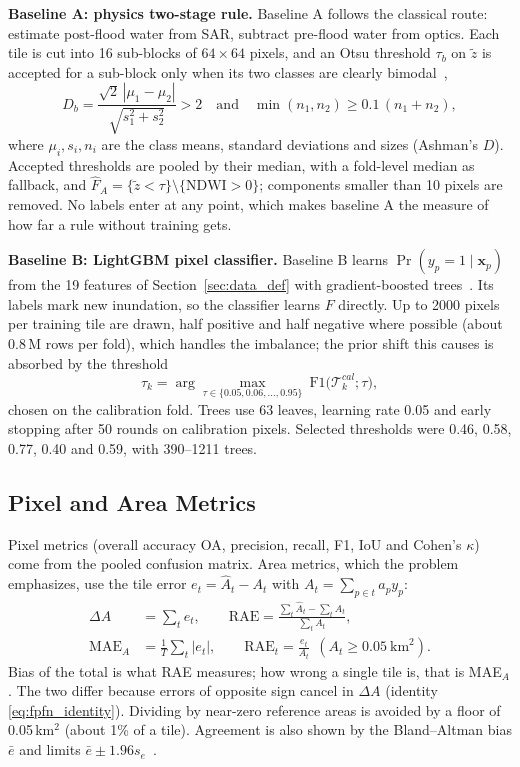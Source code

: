 \textbf{Baseline A: physics two-stage rule.} Baseline A follows the classical route: estimate post-flood water from SAR, subtract pre-flood water from optics. Each tile is cut into 16 sub-blocks of $64\times64$ pixels, and an Otsu threshold $\tau_b$ on $\tilde z$ is accepted for a sub-block only when its two classes are clearly bimodal~\cite{martinis2009splitbased},
\begin{equation}
D_b=\frac{\sqrt2\,|\mu_1-\mu_2|}{\sqrt{s_1^2+s_2^2}}>2\quad\text{and}\quad \min(n_1,n_2)\ge0.1\,(n_1+n_2),
\label{eq:ashman}
\end{equation}
where $\mu_i,s_i,n_i$ are the class means, standard deviations and sizes (Ashman's $D$). Accepted thresholds are pooled by their median, with a fold-level median as fallback, and $\hat F_A=\{\tilde z<\tau\}\setminus\{\mathrm{NDWI}>0\}$; components smaller than 10 pixels are removed. No labels enter at any point, which makes baseline A the measure of how far a rule without training gets.

\textbf{Baseline B: LightGBM pixel classifier.} Baseline B learns $\Pr(y_p=1\mid\boldsymbol x_p)$ from the 19 features of Section~\ref{sec:data_def} with gradient-boosted trees~\cite{lightgbm2020package}. Its labels mark new inundation, so the classifier learns $F$ directly. Up to 2000 pixels per training tile are drawn, half positive and half negative where possible (about 0.8\,M rows per fold), which handles the imbalance; the prior shift this causes is absorbed by the threshold
\begin{equation}
\tau_k=\arg\max_{\tau\in\{0.05,0.06,\dots,0.95\}}\ \mathrm{F1}\big(\mathcal T^{cal}_k;\tau\big),
\label{eq:tau_f1}
\end{equation}
chosen on the calibration fold. Trees use 63 leaves, learning rate 0.05 and early stopping after 50 rounds on calibration pixels. Selected thresholds were 0.46, 0.58, 0.77, 0.40 and 0.59, with 390--1211 trees.

\subsection{Pixel and Area Metrics}

Pixel metrics (overall accuracy OA, precision, recall, F1, IoU and Cohen's $\kappa$) come from the pooled confusion matrix. Area metrics, which the problem emphasizes, use the tile error $e_t=\hat A_t-A_t$ with $A_t=\sum_{p\in t}a_py_p$:
\begin{equation}
\begin{split}
\Delta A&=\sum_te_t,\qquad
\mathrm{RAE}=\frac{\sum_t\hat A_t-\sum_tA_t}{\sum_tA_t},\\
\mathrm{MAE}_A&=\frac1T\sum_t|e_t|,\qquad
\mathrm{RAE}_t=\frac{e_t}{A_t}\ \ (A_t\ge0.05\ \mathrm{km}^2).
\end{split}
\label{eq:area_metrics}
\end{equation}
Bias of the total is what RAE measures; how wrong a single tile is, that is MAE$_A$. The two differ because errors of opposite sign cancel in $\Delta A$ (identity \eqref{eq:fpfn_identity}). Dividing by near-zero reference areas is avoided by a floor of 0.05\,km$^2$ (about 1\% of a tile). Agreement is also shown by the Bland--Altman bias $\bar e$ and limits $\bar e\pm1.96s_e$~\cite{bland1986agreement}.

